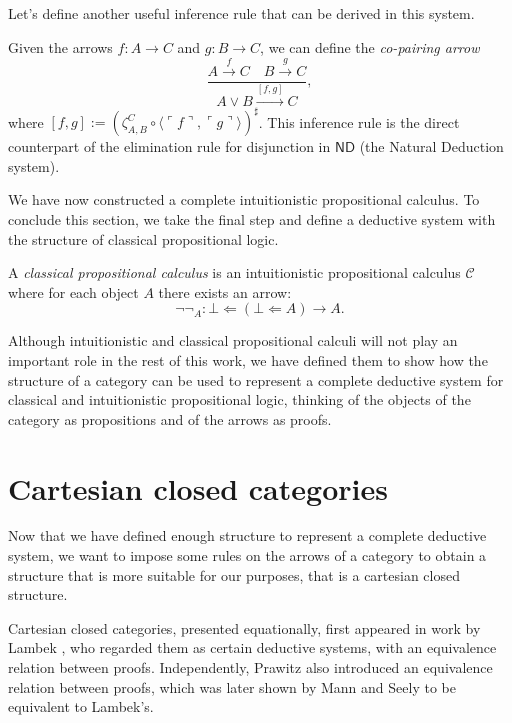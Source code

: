 Let's define another useful inference rule that can be derived in this system.

\begin{example}
    Given the arrows $f : A \to C$ and $g : B \to C$, we can define the \emph{co-pairing arrow}
    \[ \frac{A \xrightarrow{f} C \quad B \xrightarrow{g} C}{A \lor B \xrightarrow{[f,g]} C}, \]
    where $[f,g] := (\zeta_{A,B}^C \circ \langle \ulcorner f \urcorner, \ulcorner g \urcorner\rangle)^\sharp$.
    This inference rule is the direct counterpart of the elimination rule for disjunction in $\mathsf{ND}$ (the Natural Deduction system).
\end{example}

We have now constructed a complete intuitionistic propositional calculus. To conclude this section, we take the final step and define a deductive system with the structure of classical propositional logic.

\begin{definition}
    A \emph{classical propositional calculus} is an intuitionistic propositional calculus $\mathcal C$ where for each object $A$ there exists an arrow:
    \[ \neg\neg_A : \bot \Leftarrow (\bot \Leftarrow A) \to A. \]
\end{definition}

Although intuitionistic and classical propositional calculi will not play an important role in the rest of this work, we have defined them to show how the structure of a category
can be used to represent a complete deductive system for classical and intuitionistic propositional logic, thinking of the objects of the category as propositions and of the arrows as proofs.

\section{Cartesian closed categories}
Now that we have defined enough structure to represent a complete deductive system, we want to impose some rules on the arrows of a category to obtain a structure that is more suitable for our purposes, that is a cartesian closed structure.

Cartesian closed categories, presented equationally, first appeared in work by Lambek \cite{Lambek1968,Lambek1969,Lambek1972}, who regarded them as certain deductive systems, with an equivalence relation between proofs.
Independently, Prawitz \cite{Prawitz1971} also introduced an equivalence relation between proofs, which was later shown by Mann \cite{Mann1975} and Seely \cite{Seely1977} to be equivalent to Lambek's.


